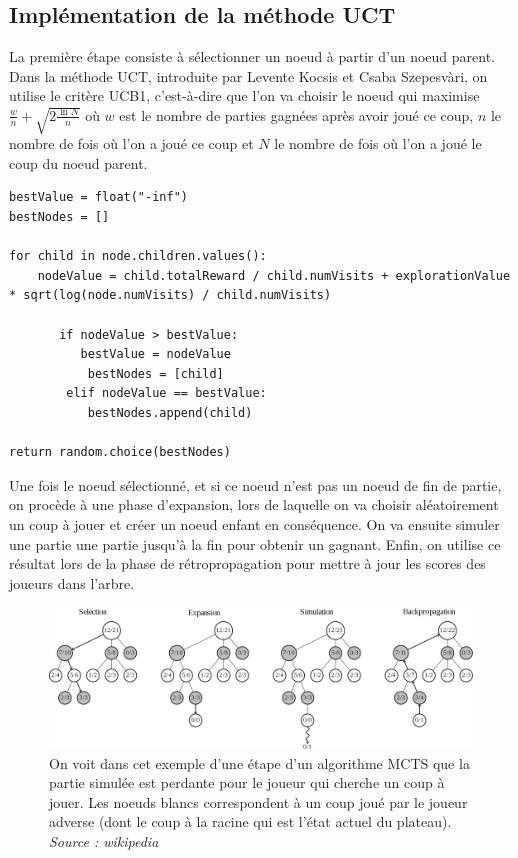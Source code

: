 \documentclass[a4paper]{article}
\theoremstyle{definition}
\begin{document}
\subsection{Implémentation de la méthode UCT}

La première étape consiste à sélectionner un noeud à partir d'un noeud parent. Dans la méthode UCT, introduite par Levente Kocsis et Csaba Szepesv\`ari, on utilise le critère UCB1, c'est-à-dire que l'on va choisir le noeud qui maximise $\frac{w}{n} + \sqrt{ 2\frac{\ln{N}}{n} }$ où $w$ est le nombre de parties gagnées après avoir joué ce coup, $n$ le nombre de fois où l'on a joué ce coup et $N$ le nombre de fois où l'on a joué le coup du noeud parent.

\begin{lstlisting}
bestValue = float("-inf")
bestNodes = []

for child in node.children.values():
	nodeValue = child.totalReward / child.numVisits + explorationValue * sqrt(log(node.numVisits) / child.numVisits)
	
       if nodeValue > bestValue:
       	  bestValue = nodeValue
           bestNodes = [child]
        elif nodeValue == bestValue:
           bestNodes.append(child)
             
return random.choice(bestNodes)
\end{lstlisting}

Une fois le noeud sélectionné, et si ce noeud n'est pas un noeud de fin de partie, on procède à une phase d'expansion, lors de laquelle on va choisir aléatoirement un coup à jouer et créer un noeud enfant en conséquence. On va ensuite simuler une partie 	une partie jusqu'à la fin pour obtenir un gagnant. Enfin, on utilise ce résultat lors de la phase de rétropropagation pour mettre à jour les scores des joueurs dans l'arbre. 

\begin{figure}[h]
\centering
\includegraphics[scale=0.18]{MCTS_wikipedia.png}
\caption{On voit dans cet exemple d'une étape d'un algorithme MCTS que la partie simulée est perdante pour le joueur qui cherche un coup à jouer. Les noeuds blancs correspondent à un coup joué par le joueur adverse (dont le coup à la racine qui est l'état actuel du plateau). \textit{Source : wikipedia}}
\end{figure}
\end{document}
